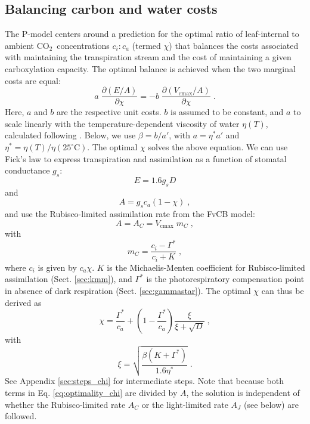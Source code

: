 \documentclass{myreport}
\newcommand{\coo}{CO$_2$}
\begin{document}
\subsection{Balancing carbon and water costs}
\label{sec:watercarbon}
The P-model centers around a prediction for the optimal ratio of leaf-internal to ambient \coo\ concentrations $c_i:c_a$ (termed $\chi$) that balances the costs associated with maintaining the transpiration stream and the cost of maintaining a given carboxylation capacity. The optimal balance is achieved when the two marginal costs are equal: 
\begin{equation}
\label{eq:optimality_chi}
a \; \frac{\partial (E/A)}{\partial \chi} = -b \; \frac{\partial (V_{\mathrm{cmax}}/A)}{\partial \chi}\;.
\end{equation}
Here, $a$ and $b$ are the respective unit costs. $b$ is assumed to be constant, and $a$ to scale linearly with the temperature-dependent viscosity of water $\eta(T)$, calculated following \citet{huber09}. Below, we use $\beta = b / a'$, with $a = \eta^\ast a'$ and $\eta^\ast = \eta(T) / \eta(25^{\circ}\text{C})$. The optimal $\chi$ solves the above equation. We can use Fick's law \citep{fick1855} to express transpiration and assimilation as a function of stomatal conductance $g_s$: 
\begin{equation}
\label{eq:egs}
    E = 1.6 g_s D
\end{equation}
and 
\begin{equation}
\label{eq:ags}
    A = g_s c_a (1-\chi) \;,
\end{equation}
and use the Rubisco-limited assimilation rate from the FvCB model:
\begin{equation}
\label{eq:ac}
    A = A_C = V_{\mathrm{cmax}} \; m_C \;,
\end{equation}
with
\begin{equation}
\label{eq:mc}
   m_C = \frac{c_i - \Gamma^{\ast}}{c_i + K}\;,
\end{equation}
where $c_i$ is given by $c_a \chi$. $K$ is the Michaelis-Menten coefficient for Rubisco-limited assimilation (Sect. \ref{sec:kmm}), and $\Gamma^{\ast}$ is the photorespiratory compensation point in absence of dark respiration (Sect. \ref{sec:gammastar}). The optimal $\chi$ can thus be derived as
\begin{equation}
\label{eq:chiopt}
\chi = \frac{\Gamma^{\ast}}{c_a} + \left(1- \frac{\Gamma^{\ast}}{c_a}\right) \frac{\xi}{\xi + \sqrt{D}}\;,
\end{equation}
with 
\begin{equation}
\label{eq:xi}
\xi = \sqrt{\frac{\beta (K+\Gamma^{\ast})}{1.6 \eta^{\ast}}}\;.
\end{equation}
See Appendix \ref{sec:steps_chi} for intermediate steps. Note that because both terms in Eq. \ref{eq:optimality_chi} are divided by $A$, the solution is independent of whether the Rubisco-limited rate $A_C$ or the light-limited rate $A_J$ (see below) are followed. 
\end{document}
